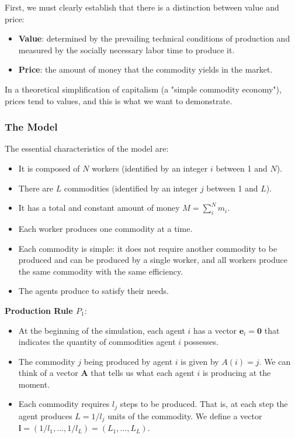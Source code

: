  First, we must clearly establish that there is a distinction between value and price:

\begin{itemize}
    \item \textbf{Value}: determined by the prevailing technical conditions of production and measured by the socially necessary labor time to produce it.
    \item \textbf{Price}: the amount of money that the commodity yields in the market.
\end{itemize}
In a theoretical simplification of capitalism (a "simple commodity economy"), prices tend to values, and this is what we want to demonstrate.

\subsubsection{The Model}

The essential characteristics of the model are:

\begin{itemize}
    \item It is composed of $N$ workers (identified by an integer $i$ between 1 and $N$).  
    \item There are $L$ commodities (identified by an integer $j$ between 1 and $L$).  
    \item It has a total and constant amount of money $M=\sum_{i}^{N}m_{i}$.  
\item Each worker produces one commodity at a time.  
\item Each commodity is simple: it does not require another commodity to be produced and can be produced by a single worker, and all workers produce the same commodity with the same efficiency.  
\item The agents produce to satisfy their needs.
\end{itemize}


\textbf{Production Rule $P_{1}$}:

\begin{itemize}
    \item  At the beginning of the simulation, each agent $i$ has a vector $\boldsymbol{e}_{i}=\boldsymbol{0}$ that indicates the quantity of commodities agent $i$ possesses.  
\item The commodity $j$ being produced by agent $i$ is given by $A(i)=j$.  We can think of a vector $\boldsymbol{A}$ that tells us what each agent $i$ is producing at the moment.  
\item Each commodity requires $l_{j}$ steps to be produced.    That is, at each step the agent produces $L=1/l_{j}$ units of the commodity.   We define a vector $\boldsymbol{l}=\left(1/l_{1},\dots,1/l_{L}\right)=\left(L_{1},\dots,L_{L}\right)$.  
\end{itemize}

